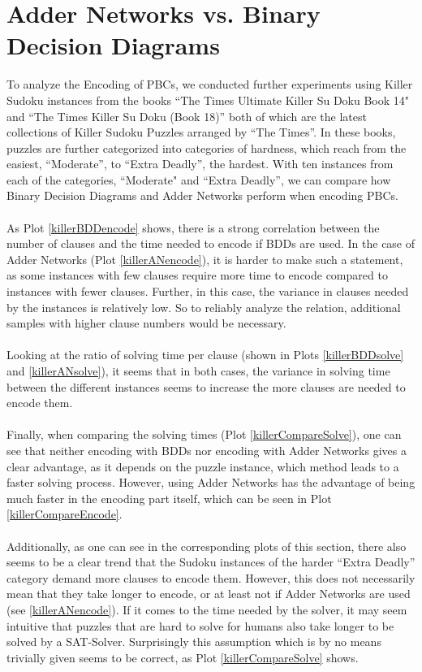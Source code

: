 \section{Adder Networks vs. Binary Decision Diagrams}
To analyze the Encoding of PBCs, we conducted further experiments using Killer Sudoku instances from the books ``The Times Ultimate Killer Su Doku Book 14"\cite{TheTimesUltimateKillerSuDokuBook14} and ``The Times Killer Su Doku (Book 18)''\cite{TheTimesKillerSuDokuBook18} both of which are the latest collections of Killer Sudoku Puzzles arranged by ``The Times''. In these books, puzzles are further categorized into categories of hardness, which reach from the easiest, ``Moderate'', to ``Extra Deadly'', the hardest. With ten instances from each of the categories, ``Moderate" and  ``Extra Deadly'', we can compare how Binary Decision Diagrams and Adder Networks perform when encoding PBCs.\\
\\
As Plot \ref{killerBDDencode} shows, there is a strong correlation between the number of clauses and the time needed to encode if BDDs are used. In the case of Adder Networks (Plot \ref{killerANencode}), it is harder to make such a statement, as some instances with few clauses require more time to encode compared to instances with fewer clauses. Further, in this case, the variance in clauses needed by the instances is relatively low. So to reliably analyze the relation, additional samples with higher clause numbers would be necessary. \\
\\
Looking at the ratio of solving time per clause (shown in Plots \ref{killerBDDsolve} and \ref{killerANsolve}), it seems that in both cases, the variance in solving time between the different instances seems to increase the more clauses are needed to encode them.\\
\\
Finally, when comparing the solving times (Plot \ref{killerCompareSolve}), one can see that neither encoding with BDDs nor encoding with Adder Networks gives a clear advantage, as it depends on the puzzle instance, which method leads to a faster solving process. However, using Adder Networks has the advantage of being much faster in the encoding part itself, which can be seen in Plot \ref{killerCompareEncode}.\\
\\
Additionally, as one can see in the corresponding plots of this section, there also seems to be a clear trend that the Sudoku instances of the harder ``Extra Deadly'' category demand more clauses to encode them. However, this does not necessarily mean that they take longer to encode, or at least not if Adder Networks are used (see \ref{killerANencode}). If it comes to the time needed by the solver, it may seem intuitive that puzzles that are hard to solve for humans also take longer to be solved by a SAT-Solver. Surprisingly this assumption which is by no means trivially given seems to be correct, as Plot \ref{killerCompareSolve} shows. 

